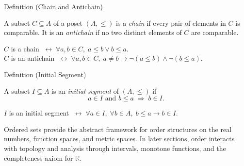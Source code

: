 \begin{definitionbox}{Definition (Chain and Antichain)}
\begin{definition}\label{def:chain}
A subset $C \subseteq A$ of a poset $(A,\leq)$ is a \emph{chain} if every
pair of elements in $C$ is comparable. It is an \emph{antichain} if no two
distinct elements of $C$ are comparable.
\end{definition}
\end{definitionbox}

\NoLocalDependencies

\begin{remark*}
$C$ is a chain $\;\leftrightarrow\; \forall a,b \in C,\; a \leq b \vee b \leq a$.\\
$C$ is an antichain $\;\leftrightarrow\; \forall a,b \in C,\; a \neq b \to \neg(a \leq b) \wedge \neg(b \leq a)$.
\end{remark*}

\begin{definitionbox}{Definition (Initial Segment)}
\begin{definition}\label{def:initial-segment}
A subset $I \subseteq A$ is an \emph{initial segment} of $(A,\leq)$ if
\[
a \in I \text{ and } b \leq a \;\Rightarrow\; b \in I.
\]
\end{definition}
\end{definitionbox}

\NoLocalDependencies

\begin{remark*}
$I$ is an initial segment $\;\leftrightarrow\; \forall a \in I,\; \forall b \in A,\; b \leq a \to b \in I$.
\end{remark*}

\begin{remark*}[Transition]
Ordered sets provide the abstract framework for order structures on the real
numbers, function spaces, and metric spaces. In later sections, order
interacts with topology and analysis through intervals, monotone functions,
and the completeness axiom for $\mathbb{R}$.
\end{remark*}


